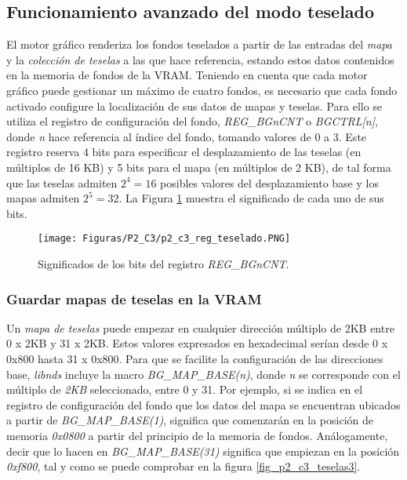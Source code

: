 \subsection{Funcionamiento avanzado del modo teselado}
El motor gráfico renderiza los fondos teselados a partir de las entradas del \textit{mapa} y la \textit{colección de teselas} a las que hace referencia, estando estos datos contenidos en la memoria de fondos de la VRAM. Teniendo en cuenta que cada motor gráfico puede gestionar un máximo de cuatro fondos, es necesario que cada fondo activado configure la localización de sus datos de mapas y teselas. Para ello se utiliza el registro de configuración del fondo, \textit{REG\_BGnCNT} o \textit{BGCTRL[n]}, donde \textit{n} hace referencia al índice del fondo, tomando valores de 0 a 3. Este registro reserva 4 bits para especificar el desplazamiento de las teselas (en múltiplos de 16 KB) y 5 bits para el mapa (en múltiplos de 2 KB), de tal forma que las teselas admiten $2^4 = 16$ posibles valores del desplazamiento base y los mapas admiten $2^5 = 32$. La Figura \ref{fig_p2_c3_reg_teselado} muestra el significado de cada uno de sus bits.

\begin{figure}[t]
\centering
\texttt{[image: Figuras/P2\_C3/p2\_c3\_reg\_teselado.PNG]}
\caption{Significados de los bits del registro \textit{REG\_BGnCNT}.}
\label{fig_p2_c3_reg_teselado}
\end{figure}

\subsubsection{Guardar mapas de teselas en la VRAM}
Un \textit{mapa de teselas} puede empezar en cualquier dirección múltiplo de 2KB entre 0 x 2KB y 31 x 2KB. Estos valores expresados en hexadecimal serían desde 0 x 0x800 hasta 31 x 0x800. Para que se facilite la configuración de las direcciones base, \textit{libnds} incluye la macro \textit{BG\_MAP\_BASE(n)}, donde \textit{n} se corresponde con el múltiplo de \textit{2KB} seleccionado, entre 0 y 31. Por ejemplo, si se indica en el registro de configuración del fondo que los datos del mapa se encuentran ubicados a partir de \textit{BG\_MAP\_BASE(1)}, significa que comenzarán en la posición de memoria \textit{0x0800} a partir del principio de la memoria de fondos. Análogamente, decir que lo hacen en \textit{BG\_MAP\_BASE(31)} significa que empiezan en la posición \textit{\textit{0xf800}}, tal y como se puede comprobar en la figura \ref{fig_p2_c3_teselas3}.

